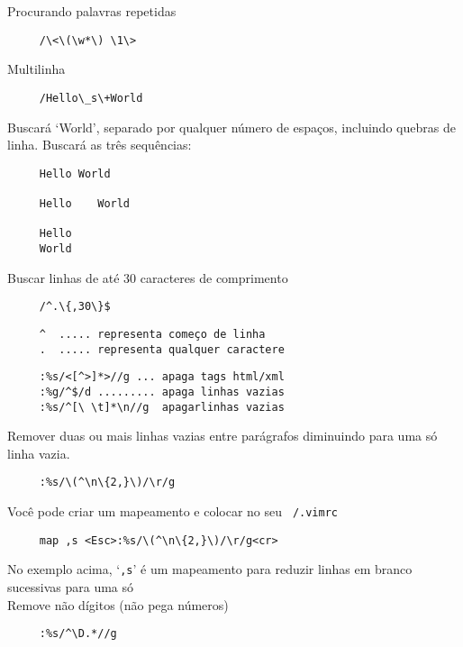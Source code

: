 Procurando palavras repetidas

\begin{verbatim}
     /\<\(\w*\) \1\>
\end{verbatim}

Multilinha

\begin{verbatim}
     /Hello\_s\+World
\end{verbatim}

Buscará `World', separado por qualquer número de espaços,
incluindo quebras de linha. Buscará as três sequências:

\begin{verbatim}
     Hello World

     Hello    World

     Hello
     World
\end{verbatim}

Buscar linhas de até 30 caracteres de comprimento

\begin{verbatim}
     /^.\{,30\}$
\end{verbatim}

\begin{verbatim}
     ^  ..... representa começo de linha
     .  ..... representa qualquer caractere
\end{verbatim}


\begin{verbatim}
     :%s/<[^>]*>//g ... apaga tags html/xml
     :%g/^$/d ......... apaga linhas vazias
     :%s/^[\ \t]*\n//g  apagarlinhas vazias
\end{verbatim}


Remover duas ou mais linhas vazias entre parágrafos diminuindo para
uma só linha vazia.

\begin{verbatim}
     :%s/\(^\n\{2,}\)/\r/g
\end{verbatim}

Você pode criar um mapeamento e colocar no seu {\tt ~/.vimrc}

\begin{verbatim}
     map ,s <Esc>:%s/\(^\n\{2,}\)/\r/g<cr>
\end{verbatim}

No exemplo acima, `{\tt ,s}' é um mapeamento para reduzir linhas em branco
sucessivas para uma só  \\


Remove não dígitos (não pega números)

\begin{verbatim}
     :%s/^\D.*//g
\end{verbatim}

